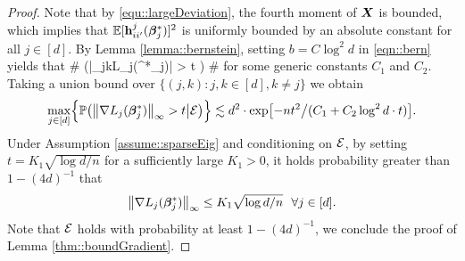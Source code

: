 \documentclass[twoside,11pt]{article}
\newcommand*{\bbetas}{\bbeta^*}
\newcommand*{\gradstarss} {\nabla {L_j}(\bbeta^*_{j})}
\newcommand*{\bbetass}{\bbeta^*_{j}}
\begin{document}
\begin{proof}
Note that by \eqref{equ::largeDeviation}, the fourth moment of $\bm{X}$ is bounded, which implies that  $\EE [\hb_{ii'}^j(\bbetass)]^2$ is uniformly bounded by an absolute constant for all $j\in [d]$.
By Lemma \ref{lemma::bernstein},  setting $b = C \log ^2 d $ in \eqref{eqn::bern} yields that 
\#\label{equ::gradientTail}
\PP\bigl(\bigl |\nabla _{jk}L_j(\bbetas_j)\bigr| > t \big\vert \cE\bigr)  \exp{}
\#
for some generic constants $C_1$ and $C_2$.  Taking a union bound over $\{ (j,k)\colon j,k\in[d], k\neq j\}$ we obtain 
\begin{align}\label{equ::gradientTail2}
\max _{j\in[d]}\Bigl\{ \PP\bigl (\bigl\|\gradstarss\bigr\|_{\infty} > t\big\vert \cE \bigr) \Bigr\}\lesssim  d^2\cdot  \exp\bigl[ -  nt^2 \big/(C_1+ C_2 \log^2 d \cdot t)\bigr].
\end{align}
Under Assumption \ref{assume::sparseEig} and conditioning on $\mathcal{E}$, by  setting $t=K_1 \sqrt{\log  d /n}$ for a sufficiently large $K_1>0$, it holds  probability greater than $1- (4d)^{-1}$ that  
$$
\bigl\|\gradstarss\bigr\|_\infty \leq K_1\sqrt{\log d/ n}~~\forall j \in [d].
$$ 
Note that  $\mathcal{E}$ holds with probability at least $1- (4d)^{-1}$, we conclude the proof of Lemma \ref{thm::boundGradient}.
\end{proof}
\end{document}
